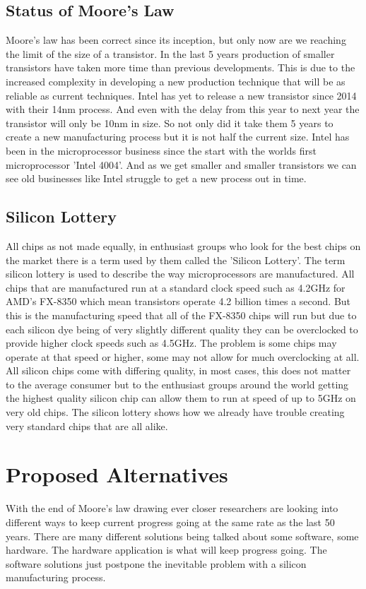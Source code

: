\documentclass[journal]{IEEEtran}
\begin{document}
\subsection{Status of Moore's Law}
Moore's law has been correct since its inception, but only now are we reaching the limit of the size of a transistor. \cite{591665} In the last 5 years production of smaller transistors have taken more time than previous developments. This is due to the increased complexity in developing a new production technique that will be as reliable as current techniques. Intel has yet to release a new transistor since 2014 with their 14nm process. And even with the delay from this year to next year the transistor will only be 10nm in size. So not only did it take them 5 years to create a new manufacturing process but it is not half the current size. Intel has been in the microprocessor business since the start with the worlds first microprocessor 'Intel 4004'. And as we get smaller and smaller transistors we can see old businesses like Intel struggle to get a new process out in time.

\subsection{Silicon Lottery}
All chips as not made equally, in enthusiast groups who look for the best chips on the market there is a term used by them called the 'Silicon Lottery'. The term silicon lottery is used to describe the way microprocessors are manufactured. All chips that are manufactured run at a standard clock speed such as 4.2GHz for AMD's FX-8350 which mean transistors operate 4.2 billion times a second. But this is the manufacturing speed that all of the FX-8350 chips will run but due to each silicon dye being of very slightly different quality they can be overclocked to provide higher clock speeds such as 4.5GHz. The problem is some chips may operate at that speed or higher, some may not allow for much overclocking at all. All silicon chips come with differing quality, in most cases, this does not matter to the average consumer but to the enthusiast groups around the world getting the highest quality silicon chip can allow them to run at speed of up to 5GHz on very old chips. The silicon lottery shows how we already have trouble creating very standard chips that are all alike.

\section{Proposed Alternatives}
With the end of Moore's law drawing ever closer researchers are looking into different ways to keep current progress going at the same rate as the last 50 years. There are many different solutions being talked about some software, some hardware. The hardware application is what will keep progress going. The software solutions just postpone the inevitable problem with a silicon manufacturing process.
\end{document}
